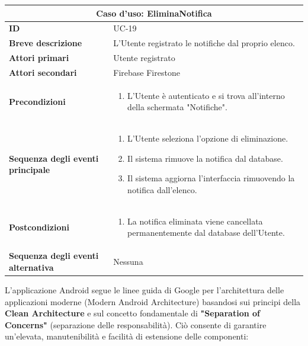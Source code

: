 \documentclass[a4paper]{report}
\begin{document}
\begin{table}[H]
\vspace*{-0cm}
\renewcommand{\arraystretch}{1.9}
\begin{tabular}{|p{3.9cm}|p{9.9cm}|}
\hline
\multicolumn{2}{|c|}{\textbf{Caso d’uso: EliminaNotifica}} \\ \hline
\textbf{ID} & UC-19 \\ \hline
\textbf{Breve descrizione} & L'Utente registrato le notifiche dal proprio elenco. \\ \hline
\textbf{Attori primari} & Utente registrato \\ \hline
\textbf{Attori secondari} & Firebase Firestone \\ \hline
\textbf{Precondizioni} & \begin{enumerate}[leftmargin=14pt,label=\arabic*.,labelsep=0.5em,topsep=0pt,partopsep=0pt,parsep=0pt,itemsep=0pt]
    \item L'Utente è autenticato e si trova all'interno della schermata "Notifiche".
\end{enumerate} \\ \hline
\textbf{Sequenza degli eventi principale} &
\begin{enumerate}[leftmargin=14pt,label=\arabic*.,labelsep=0.5em,topsep=0pt,partopsep=0pt,parsep=0pt,itemsep=0pt]
   \item L'Utente seleziona l'opzione di eliminazione.
   \item Il sistema rimuove la notifica dal database.
   \item Il sistema aggiorna l'interfaccia rimuovendo la notifica dall'elenco.
\end{enumerate}\\ \hline
\textbf{Postcondizioni} &
\begin{enumerate}[leftmargin=14pt,label=\arabic*.,labelsep=0.5em,topsep=0pt,partopsep=0pt,parsep=0pt,itemsep=0pt]
\item La notifica eliminata viene cancellata permanentemente dal database dell'Utente.
\end{enumerate} \\ \hline
\textbf{Sequenza degli eventi alternativa} & Nessuna \\ \hline
\end{tabular}
\end{table}


L'applicazione Android segue le linee guida di Google per l'architettura delle applicazioni moderne (Modern Android Architecture) basandosi sui principi della \textbf{Clean Architecture} e sul concetto fondamentale di \textbf{"Separation of Concerns"} (separazione delle responsabilità). Ciò consente di garantire un'elevata, manutenibilità e facilità di estensione delle componenti:
\end{document}
